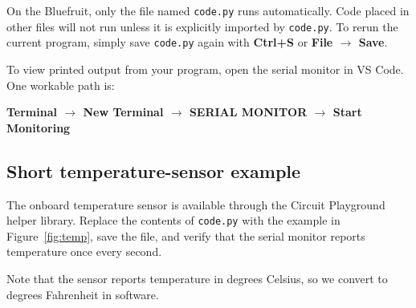 \documentclass[11pt]{article}
\newcommand{\kit}[1]{\texttt{#1}}
\begin{document}
\begin{warningbox}
On the Bluefruit, only the file named \kit{code.py} runs automatically. Code placed in other files will not run unless it is explicitly imported by \kit{code.py}. To rerun the current program, simply save \kit{code.py} again with \textbf{Ctrl+S} or \textbf{File $\rightarrow$ Save}.
\end{warningbox}

To view printed output from your program, open the serial monitor in VS Code. One workable path is:
\begin{center}
\textbf{Terminal $\rightarrow$ New Terminal $\rightarrow$ SERIAL MONITOR $\rightarrow$ Start Monitoring}
\end{center}

\subsection{Short temperature-sensor example}
The onboard temperature sensor is available through the Circuit Playground helper library. Replace the contents of \kit{code.py} with the example in Figure~\ref{fig:temp}, save the file, and verify that the serial monitor reports temperature once every second.

Note that the sensor reports temperature in degrees Celsius, so we convert to degrees Fahrenheit in software.
\end{document}
